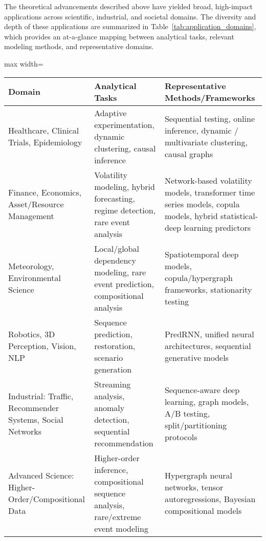 The theoretical advancements described above have yielded broad, high-impact applications across scientific, industrial, and societal domains. The diversity and depth of these applications are summarized in Table~\ref{tab:application_domains}, which provides an at-a-glance mapping between analytical tasks, relevant modeling methods, and representative domains.

\begin{table*}[htbp]
\centering
\caption{Representative Application Domains and Associated Analytical Frameworks}
\label{tab:application_domains}
\begin{adjustbox}{max width=\textwidth}
\begin{tabular}{lll}
\toprule
\textbf{Domain} & \textbf{Analytical Tasks} & \textbf{Representative Methods/Frameworks} \\
\midrule
Healthcare, Clinical Trials, Epidemiology 
    & Adaptive experimentation, dynamic clustering, causal inference 
    & Sequential testing, online inference, dynamic / multivariate clustering, causal graphs \cite{ref24,ref25,ref30,ref81,ref86} \\
Finance, Economics, Asset/Resource Management 
    & Volatility modeling, hybrid forecasting, regime detection, rare event analysis 
    & Network-based volatility models, transformer time series models, copula models, hybrid statistical-deep learning predictors \cite{ref2,ref7,ref8,ref10,ref16,ref59,ref60} \\
Meteorology, Environmental Science 
    & Local/global dependency modeling, rare event prediction, compositional analysis 
    & Spatiotemporal deep models, copula/hypergraph frameworks, stationarity testing \cite{ref32,ref35,ref58,ref59,ref79} \\
Robotics, 3D Perception, Vision, NLP 
    & Sequence prediction, restoration, scenario generation 
    & PredRNN, unified neural architectures, sequential generative models \cite{ref37,ref39,ref40,ref73,ref74} \\
Industrial: Traffic, Recommender Systems, Social Networks 
    & Streaming analysis, anomaly detection, sequential recommendation 
    & Sequence-aware deep learning, graph models, A/B testing, split/partitioning protocols \cite{ref2,ref9,ref47,ref58,ref85,ref87} \\
Advanced Science: Higher-Order/Compositional Data 
    & Higher-order inference, compositional sequence analysis, rare/extreme event modeling 
    & Hypergraph neural networks, tensor autoregressions, Bayesian compositional models \cite{ref58,ref59,ref60,ref61,ref65,ref74} \\
\bottomrule
\end{tabular}
\end{adjustbox}
\end{table*}

